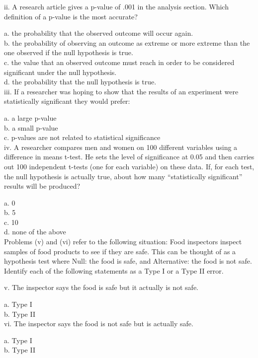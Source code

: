 \documentclass[11pt]{isuthesis}\usepackage[]{graphicx}\usepackage[]{color}
\begin{document}
\begin{appendices}
ii. A research article gives a p-value of .001 in the analysis section. Which definition of a p-value is the most accurate?

a. the probability that the observed outcome will occur again.\\
b. the probability of observing an outcome as extreme or more extreme than the one observed if the null hypothesis is true.\\
c. the value that an observed outcome must reach in order to be considered significant under the null hypothesis.\\
d. the probability that the null hypothesis is true.\\

iii. If a researcher was hoping to show that the results of an experiment were statistically significant they would prefer:

a. a large p-value\\
b. a small p-value\\
c. p-values are not related to statistical significance\\


iv. A researcher compares men and women on 100 different variables using a difference in means t-test.  He sets the level of significance at 0.05 and then carries out 100 independent t-tests (one for each variable) on these data.  If, for each test, the null hypothesis is actually true, about how many ``statistically significant'' results will be produced?

a. 0\\
b. 5\\
c. 10\\
d. none of the above\\

Problems (v) and (vi) refer to the following situation: Food inspectors inspect samples of food products to see if they are safe. This can be thought of as a hypothesis test where Null: the food is safe, and Alternative: the food is not safe. Identify each of the following statements as a Type I or a Type II error.

v. The inspector says the food is safe but it actually is not safe.

a. Type I\\
b. Type II\\

vi. The inspector says the food is not safe but is actually safe.

a. Type I\\
b. Type II\\


\end{appendices}
\end{document}
